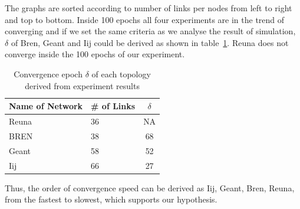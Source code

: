 The graphs are sorted according to number of links per nodes from left to right and top to bottom. Inside 100 epochs all four experiments are in the trend of converging and if we set the same criteria as we analyse the result of simulation, $\delta$ of Bren, Geant and Iij could be derived as shown in table~\ref{table:exp}. Reuna does not converge inside the 100 epochs of our experiment.
\begin{table}
\centering
\caption{Convergence epoch $\delta$ of each topology derived from experiment results}
\begin{tabular}{llc}
	\hline
	Name of Network &  \# of Links & $\delta$ \\
    	\hline
    	Reuna & 36 & NA\\
    	BREN & 38 & 68\\
    	Geant & 58 & 52\\
    	Iij & 66 & 27\\
    	\hline
\end{tabular}
\label{table:exp}
\end{table}

Thus, the order of convergence speed can be derived as Iij, Geant, Bren, Reuna, from the fastest to slowest, which supports our hypothesis.
